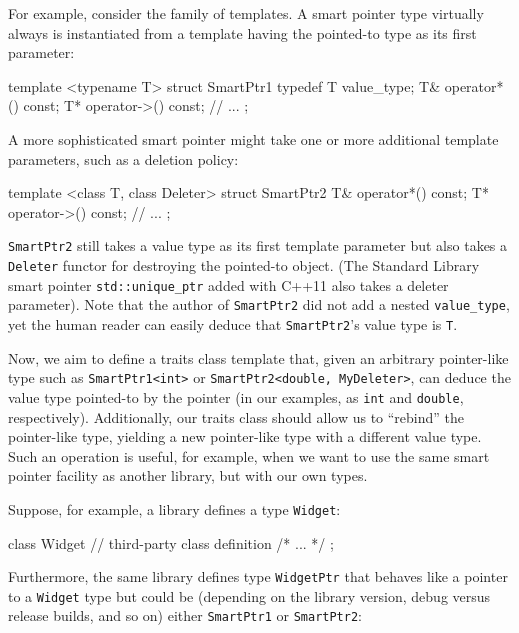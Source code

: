 For example, consider the family of  templates. A
smart pointer type virtually always is instantiated from a template
having the pointed-to type as its first parameter:

\begin{emcppslisting}
template <typename T>
struct SmartPtr1
{
    typedef T value_type;
    T& operator*() const;
    T* operator->() const;
    // ...
};
\end{emcppslisting}
    

\noindent A more sophisticated smart pointer might take one or more additional
template parameters, such as a deletion policy:

\begin{emcppslisting}
template <class T, class Deleter>
struct SmartPtr2
{
    T& operator*() const;
    T* operator->() const;
    // ...
};
\end{emcppslisting}
    

\noindent \lstinline!SmartPtr2! still takes a value type as its first template
parameter but also takes a \lstinline!Deleter! functor for destroying the
pointed-to object. (The Standard Library smart pointer\linebreak%
\lstinline!std::unique_ptr! added with C++11 also takes a deleter
parameter). Note that the author of \lstinline!SmartPtr2! did not add a
nested \lstinline!value_type!, yet the human reader can easily deduce that
\lstinline!SmartPtr2!'s value type is \lstinline!T!.

Now, we aim to define a traits class template that, given an arbitrary
pointer-like type such as \lstinline!SmartPtr1<int>! or
\lstinline!SmartPtr2<double,!~\lstinline!MyDeleter>!, can deduce the value
type pointed-to by the pointer (in our examples, as \lstinline!int! and
\lstinline!double!, respectively). Additionally, our traits class should
allow us to ``rebind'' the pointer-like type, yielding a new
pointer-like type with a different value type. Such an operation is
useful, for example, when we want to use the same smart pointer facility
as another library, but with our own types.

Suppose, for example, a library defines a type \lstinline!Widget!:

\begin{emcppslisting}
class Widget           // third-party class definition
{ /* ... */ };
\end{emcppslisting}
    

\noindent Furthermore, the same library defines type \lstinline!WidgetPtr! that
behaves like a pointer to a \lstinline!Widget! type but could be (depending
on the library version, debug versus release builds, and so on) either
\lstinline!SmartPtr1! or \lstinline!SmartPtr2!:

